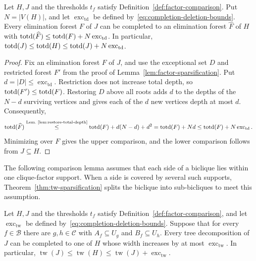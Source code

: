 \begin{lemma}
\label{lem:total-depth-comparison}
Let $H,J$ and the thresholds $t_f$ satisfy
Definition~\ref{def:factor-comparison}. Put $N=|V(H)|$, and let
$\operatorname{exc}_{\mathrm{td}}$ be defined by~\eqref{eq:completion-deletion-bounds}.
Every elimination
forest $F$ of $J$ can be completed to an elimination forest
$\widehat F$ of $H$ with
$\operatorname{totd}(\widehat F)\le\operatorname{totd}(F)+N\operatorname{exc}_{\mathrm{td}}$.
In particular,
$\operatorname{totd}(J)\le \operatorname{totd}(H)\le\operatorname{totd}(J)+N\operatorname{exc}_{\mathrm{td}}$.
\end{lemma}

\begin{proof}
Fix an elimination forest $F$ of $J$, and use the exceptional set $D$
and restricted forest $F'$ from the proof of
Lemma~\ref{lem:factor-sparsification}.
Put $d=|D|\le\operatorname{exc}_{\mathrm{td}}$. Restriction does not
increase total depth, so $\operatorname{totd}(F')\le\operatorname{totd}(F)$. Restoring $D$
above all roots adds $d$ to the depths of the $N-d$ surviving
vertices and gives each of the $d$ new vertices depth at most $d$.
Consequently,
\[
 \operatorname{totd}(\widehat F)
 \overset{\text{Lem.~\ref{lem:restore-total-depth}}}{\leq}
 \operatorname{totd}(F)+d(N-d)+d^2
 =\operatorname{totd}(F)+Nd
 \le\operatorname{totd}(F)+N\operatorname{exc}_{\mathrm{td}}.
\]
Minimizing over $F$ gives the upper comparison, and
the lower comparison follows from $J\subseteq H$.
\end{proof}

The following comparison lemma assumes that each side of a biclique
lies within one clique-factor support. When a side is covered by
several such supports, Theorem~\ref{thm:tw-sparsification} splits the
biclique into sub-bicliques to meet this assumption.

\begin{lemma}
\label{lem:tw-factor-sparsification}
Let $H,J$ and the thresholds $t_f$ satisfy
Definition~\ref{def:factor-comparison}, and let $\operatorname{exc}_{\mathrm{tw}}$
be defined by~\eqref{eq:completion-deletion-bounds}. Suppose that for
every $f\in\mathcal B$ there are $g,h\in\mathcal C$ with
$A_f\subseteq U_g$ and $B_f\subseteq U_h$.
Every tree
decomposition of $J$ can be completed to one of $H$ whose width
increases by at most $\operatorname{exc}_{\mathrm{tw}}$. In particular,
$\operatorname{tw}(J)\le\operatorname{tw}(H)
 \le\operatorname{tw}(J)+\operatorname{exc}_{\mathrm{tw}}$.
\end{lemma}

